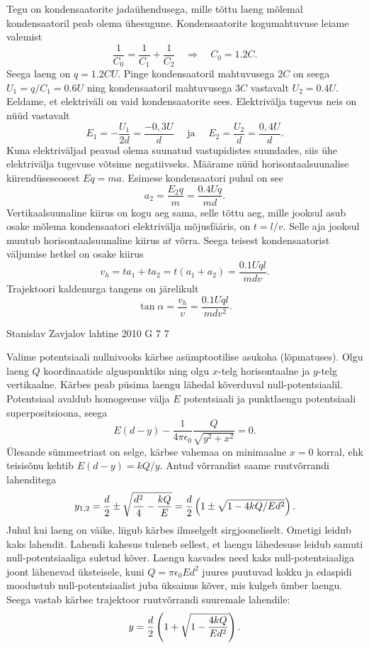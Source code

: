 \documentclass[11pt]{article}
\begin{document}
{{\ifSolution
Tegu on kondensaatorite jadaühendusega, mille tõttu laeng mõlemal kondensaatoril peab olema ühesugune. Kondensaatorite kogumahtuvuse leiame valemist 
\[
\frac{1}{C_{0}}=\frac{1}{C_{1}}+\frac{1}{C_{2}} \quad \Rightarrow \quad C_{0}=\num{1,2} C.
\]
Seega laeng on $q = \num{1,2}CU$. Pinge kondensaatoril mahtuvusega $2C$ on seega $U_1 = q/C_1 = \num{0,6}U$ ning kondensaatoril mahtuvusega $3C$ vastavalt $U_2 = \num{0,4}U$. Eeldame, et elektriväli on vaid kondensaatorite sees. Elektrivälja tugevus neis on nüüd vastavalt
\[
E_{1}=-\frac{U_{1}}{2 d}=\frac{-0,3 U}{d} \quad \text { ja } \quad E_{2}=\frac{U_{2}}{d}=\frac{0,4 U}{d}.
\]
Kuna elektriväljad peavad olema suunatud vastupidistes suundades, siis ühe elektrivälja tugevuse võtsime negatiivseks. Määrame nüüd horisontaalsuunalise kiirendüseseosest $Eq = ma$. Esimese kondensaatori puhul on see
\[
a_{2}=\frac{E_{2} q}{m}=\frac{\num{0,4} U q}{m d}.
\]
Vertikaalsuunaline kiirus on kogu aeg sama, selle tõttu aeg, mille jooksul asub osake mõlema kondensaatori elektrivälja mõjusfääris, on $t = l/v$. Selle aja jooksul muutub horisontaalsuunaline kiirus $at$ võrra. Seega teisest kondensaatorist väljumise hetkel on osake kiirus
\[
v_{h}=t a_{1}+t a_{2}=t\left(a_{1}+a_{2}\right)=\frac{\num{0,1} U q l}{m d v}.
\]
Trajektoori kaldenurga tangens on järelikult
\[
\tan \alpha = \frac{v_h}{v} = \frac{\num{0,1}Uql}{mdv^2}.
\]
\fi
}

{Stanislav Zavjalov} %
{lahtine} %
{2010} %
{G 7} %
{7} %
{

\ifSolution
Valime potentsiaali nullnivooks kärbse asümptootilise asukoha (lõpmatuses). 
Olgu laeng $Q$ koordinaatide alguspunktiks ning olgu $x$-telg horisontaalne ja $y$-telg vertikaalne. 
Kärbes peab püsima laengu lähedal kõverduval null-potentsiaalil. 
Potentsiaal avaldub homogeense välja $E$ potentsiaali ja punktlaengu potentsiaali superpositsioona, seega 
\[
E(d - y) - \frac{1}{4\pi\epsilon_0}\frac{Q}{\sqrt{y^2 + x^2}} = 0.
\]
Ülesande sümmeetriast on selge, kärbse vahemaa on minimaalne $x=0$ korral, ehk teisisõnu kehtib $E(d-y) = kQ/y$. Antud võrrandist saame ruutvõrrandi lahenditega
\[
y_{1,2} = {d \over 2} \pm \sqrt{\frac {d^2}4 - {kQ \over E}} = {d \over 2}\left( 1 \pm \sqrt{1 - 4kQ / Ed^2}\right).
\] 
Juhul kui laeng on väike, liigub kärbes ilmselgelt sirgjooneliselt. Ometigi leidub kaks lahendit. Lahendi kahesus tuleneb sellest, et laengu lähedesuse leidub samuti
null-potentsiaaliga suletud kõver. Laengu kasvades need kaks null-potentsiaaliga joont lähenevad üksteisele, kuni $Q=\pi\epsilon_0Ed^2$ juures 
puutuvad kokku ja edaspidi moodustub null-potentsiaalist juba üksainus kõver, mis kulgeb ümber laengu. 
Seega vastab kärbse trajektoor ruutvõrrandi suuremale lahendile:
$$y= {d \over 2}\left(1 + \sqrt{1 - {4kQ \over Ed^2}}\right).$$ 
\fi
}

}
\end{document}
